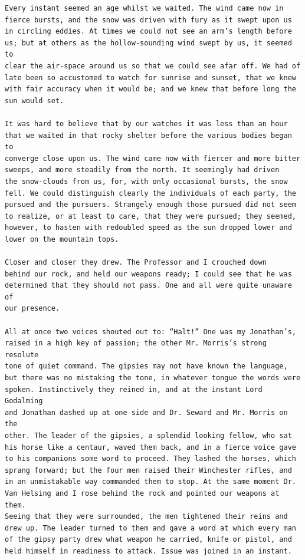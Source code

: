 \documentclass{article}
\begin{document}
\begin{verbatim}
Every instant seemed an age whilst we waited. The wind came now in
fierce bursts, and the snow was driven with fury as it swept upon us
in circling eddies. At times we could not see an arm’s length before
us; but at others as the hollow-sounding wind swept by us, it seemed to
clear the air-space around us so that we could see afar off. We had of
late been so accustomed to watch for sunrise and sunset, that we knew
with fair accuracy when it would be; and we knew that before long the
sun would set.

It was hard to believe that by our watches it was less than an hour
that we waited in that rocky shelter before the various bodies began to
converge close upon us. The wind came now with fiercer and more bitter
sweeps, and more steadily from the north. It seemingly had driven
the snow-clouds from us, for, with only occasional bursts, the snow
fell. We could distinguish clearly the individuals of each party, the
pursued and the pursuers. Strangely enough those pursued did not seem
to realize, or at least to care, that they were pursued; they seemed,
however, to hasten with redoubled speed as the sun dropped lower and
lower on the mountain tops.

Closer and closer they drew. The Professor and I crouched down
behind our rock, and held our weapons ready; I could see that he was
determined that they should not pass. One and all were quite unaware of
our presence.

All at once two voices shouted out to: “Halt!” One was my Jonathan’s,
raised in a high key of passion; the other Mr. Morris’s strong resolute
tone of quiet command. The gipsies may not have known the language,
but there was no mistaking the tone, in whatever tongue the words were
spoken. Instinctively they reined in, and at the instant Lord Godalming
and Jonathan dashed up at one side and Dr. Seward and Mr. Morris on the
other. The leader of the gipsies, a splendid looking fellow, who sat
his horse like a centaur, waved them back, and in a fierce voice gave
to his companions some word to proceed. They lashed the horses, which
sprang forward; but the four men raised their Winchester rifles, and
in an unmistakable way commanded them to stop. At the same moment Dr.
Van Helsing and I rose behind the rock and pointed our weapons at them.
Seeing that they were surrounded, the men tightened their reins and
drew up. The leader turned to them and gave a word at which every man
of the gipsy party drew what weapon he carried, knife or pistol, and
held himself in readiness to attack. Issue was joined in an instant.


\end{verbatim}
\end{document}
